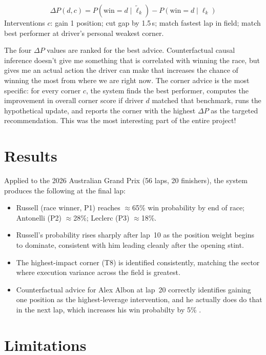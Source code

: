 \documentclass[10pt,twocolumn]{article}
\begin{document}
\begin{infobox}
\[
  \Delta P(d, c) = P(\text{win}=d \mid \tilde\ell_k) - P(\text{win}=d \mid \ell_k)
\]
Interventions $c$: gain 1 position; cut gap by 1.5\,s; match fastest lap
in field; match best performer at driver's personal weakest corner.
\end{infobox}

The four $\Delta P$ values are ranked for the best advice. Counterfactual causal inference doesn't give
me something that is correlated with winning the race, but gives me an actual action the driver can make
that increases the chance of winning  the most from  where we are right now. The
corner advice is the most specific: for every corner $c$, the system finds the
best performer, computes the improvement in overall corner score if driver
$d$ matched that benchmark, runs the hypothetical update, and reports the corner
with the highest $\Delta P$ as the targeted recommendation. This was the most interesting part of the entire project!

\section{Results}

Applied to the 2026 Australian Grand Prix (56 laps, 20 finishers), the system
produces the following at the final lap:

\begin{itemize}
  \item Russell (race winner, P1) reaches $\approx$65\% win probability by
    end of race; Antonelli (P2) $\approx$28\%; Leclerc (P3) $\approx$18\%.
  \item Russell's probability rises sharply after lap~10 as the position weight
    begins to dominate, consistent with him leading cleanly after the opening
    stint.
  \item The highest-impact corner (T8) is identified consistently, matching the
    sector where execution variance across the field is greatest.
  \item Counterfactual advice for Alex Albon at lap~20 correctly
    identifies gaining one position as the highest-leverage intervention, and he actually
    does do that in the next lap, which increases his win probabilty by 5\% . 
\end{itemize}

\section{Limitations}
\end{document}
